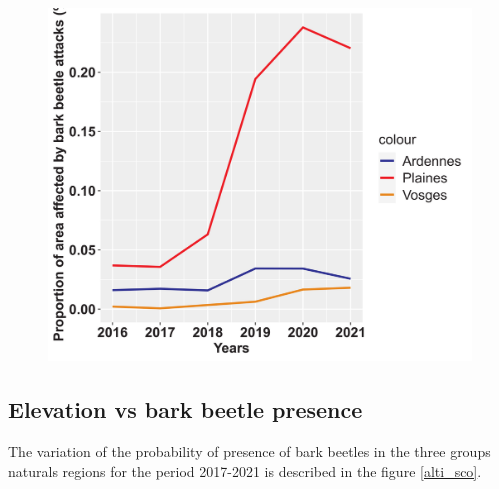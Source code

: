 \documentclass[3p,procedia]{elsarticle}
\begin{document}
\begin{figure}
\centering
   \includegraphics[width=\textwidth]{Annual_evol_Ardennes_vosges_plaines.jpeg}
     \caption{}
	\label{evol_gen}
\end{figure}

    



\subsection{ Elevation vs bark beetle presence}
The variation of the probability of presence of bark beetles in the three groups naturals regions for the period 2017-2021 is described in the figure 
\ref{alti_sco}.
\end{document}
